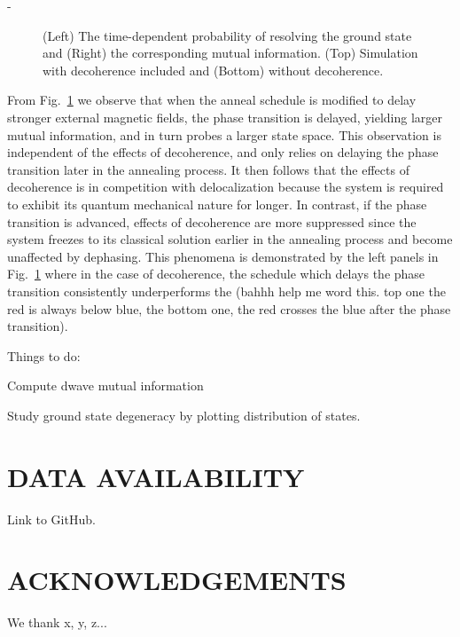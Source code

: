 -\documentclass[prd,twocolumn,tightenlines,preprintnumbers,showpacs,superscriptaddress,notitlepage,nofootinbib,eqsecnum,floatfix,longbibliography]{revtex4}
\begin{document}
\begin{figure}
    \caption{(Left) The time-dependent probability of resolving the ground state and (Right) the corresponding mutual information.
(Top) Simulation with decoherence included and (Bottom) without decoherence.}
    \label{fig:prob_mi}
\end{figure}

From Fig.~\ref{fig:prob_mi} we observe that when the anneal schedule is modified to delay stronger external magnetic fields, the phase transition is delayed, yielding larger mutual information, and in turn probes a larger state space.
This observation is independent of the effects of decoherence, and only relies on delaying the phase transition later in the annealing process.
It then follows that the effects of decoherence is in competition with delocalization because the system is required to exhibit its quantum mechanical nature for longer.
In contrast, if the phase transition is advanced, effects of decoherence are more suppressed since the system freezes to its classical solution earlier in the annealing process and {\color{blue}become unaffected by dephasing.} This phenomena is demonstrated by the left panels in Fig.~\ref{fig:prob_mi} where in the case of decoherence, the schedule which delays the phase transition consistently underperforms the (bahhh help me word this.
top one the red is always below blue, the bottom one, the red crosses the blue after the phase transition).

Things to do:

Compute dwave mutual information

Study ground state degeneracy by plotting distribution of states.

\section{DATA AVAILABILITY}

Link to GitHub.

\section{ACKNOWLEDGEMENTS}

We thank x, y, z...
\end{document}
